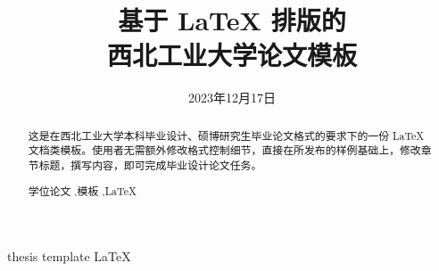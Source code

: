 \documentclass[lang=chs, degree=phd, blindreview=false, winfonts=true, academic=true]{yanputhesis}
\title{基于 LaTeX 排版的 \\ 西北工业大学论文模板}{          %
    Yet Another Thesis Template of \\ Northwestern Polytechnical University
}                                                           %
\author{\blindreview{张三丰}}{\blindreview{Sanfeng Zhang}}  %
\date{2023年12月17日}{November 17, 2023}
\begin{document}
\frontmatter                                                %
\maketitle                                                  %
\begin{abstract}                                            %
    这是在西北工业大学本科毕业设计、硕博研究生毕业论文格式的要求下的一份 LaTeX
    文档类模板。使用者无需额外修改格式控制细节，直接在所发布的样例基础上，修改章
    节标题，撰写内容，即可完成毕业设计论文任务。            %
    \begin{keywords}                                        %
        学位论文 \sep 模板 \sep \LaTeX                      %
    \end{keywords}                                          %
\end{abstract}                                              %
\begin{engabstract}                                         %
    \noindent \blindtext                                    %
    \begin{engkeywords}                                     %
        thesis \ensep template \ensep \LaTeX                %
    \end{engkeywords}                                       %
\end{engabstract}                                           %
\end{document}
